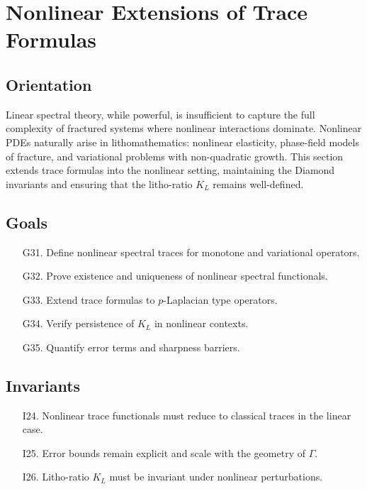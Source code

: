 \section{Nonlinear Extensions of Trace Formulas}
\label{sec:nonlinear-traces}

\subsection*{Orientation}

Linear spectral theory, while powerful, is insufficient to capture the full complexity of fractured systems where nonlinear interactions dominate.  
Nonlinear PDEs naturally arise in lithomathematics: nonlinear elasticity, phase-field models of fracture, and variational problems with non-quadratic growth.  
This section extends trace formulas into the nonlinear setting, maintaining the Diamond invariants and ensuring that the litho-ratio $K_L$ remains well-defined.  

\subsection*{Goals}

\begin{itemize}
  \item[G31.] Define nonlinear spectral traces for monotone and variational operators. 
  \item[G32.] Prove existence and uniqueness of nonlinear spectral functionals. 
  \item[G33.] Extend trace formulas to $p$-Laplacian type operators. 
  \item[G34.] Verify persistence of $K_L$ in nonlinear contexts. 
  \item[G35.] Quantify error terms and sharpness barriers. 
\end{itemize}

\subsection*{Invariants}

\begin{itemize}
  \item[I24.] Nonlinear trace functionals must reduce to classical traces in the linear case. 
  \item[I25.] Error bounds remain explicit and scale with the geometry of $\Gamma$. 
  \item[I26.] Litho-ratio $K_L$ must be invariant under nonlinear perturbations. 
\end{itemize}

